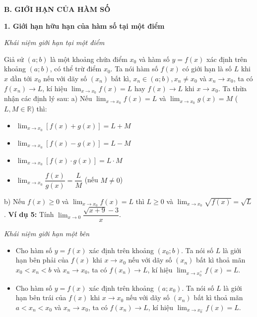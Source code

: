 \documentclass[12pt,a4paper]{extarticle}
\begin{document}
\noindent\textbf{B. GIỚI HẠN CỦA HÀM SỐ}

\noindent\textbf{1. Giới hạn hữu hạn của hàm số tại một điểm}
\vspace{0.2cm}

\noindent\textit{Khái niệm giới hạn tại một điểm}

\noindent Giả sử $(a; b)$ là một khoảng chứa điểm $x_0$ và hàm số $y = f(x)$ xác định trên khoảng $(a; b)$, có thể trừ điểm $x_0$. Ta nói hàm số $f(x)$ có giới hạn là số $L$ khi $x$ dần tới $x_0$ nếu với dãy số $(x_n)$ bất kì, $x_n \in (a; b), x_n \ne x_0$ và $x_n \to x_0$, ta có $f(x_n) \to L$, kí hiệu $\lim_{x \to x_0} f(x) = L$ hay $f(x) \to L$ khi $x \to x_0$.
\vspace{0.3cm}
\noindent Ta thừa nhận các định lý sau:
\noindent a) Nếu $\lim_{x \to x_0} f(x) = L$ và $\lim_{x \to x_0} g(x) = M$ ($L, M \in \mathbb{R}$) thì:
\begin{itemize}
    \item $\lim_{x \to x_0} [f(x) + g(x)] = L + M$
    \item $\lim_{x \to x_0} [f(x) - g(x)] = L - M$
    \item $\lim_{x \to x_0} [f(x) \cdot g(x)] = L \cdot M$
    \item $\lim_{x \to x_0} \dfrac{f(x)}{g(x)} = \dfrac{L}{M}$ (nếu $M \ne 0$)
\end{itemize}
\noindent b) Nếu $f(x) \ge 0$ và $\lim_{x \to x_0} f(x) = L$ thì $L \ge 0$ và $\lim_{x \to x_0} \sqrt{f(x)} = \sqrt{L}$.
\vspace{0.4cm}
\noindent\textbf{Ví dụ 5:} Tính $\lim_{x \to 0} \dfrac{\sqrt{x + 9} - 3}{x}$.
\vspace{0.6cm}

\noindent\textit{Khái niệm giới hạn một bên}
\begin{itemize}
    \item Cho hàm số $y = f(x)$ xác định trên khoảng $(x_0; b)$. Ta nói số $L$ là giới hạn bên phải của $f(x)$ khi $x \to x_0$ nếu với dãy số $(x_n)$ bất kì thoả mãn $x_0 < x_n < b$ và $x_n \to x_0$, ta có $f(x_n) \to L$, kí hiệu $\lim_{x \to x_0^+} f(x) = L$.
    \item Cho hàm số $y = f(x)$ xác định trên khoảng $(a; x_0)$. Ta nói số $L$ là giới hạn bên trái của $f(x)$ khi $x \to x_0$ nếu với dãy số $(x_n)$ bất kì thoả mãn $a < x_n < x_0$ và $x_n \to x_0$, ta có $f(x_n) \to L$, kí hiệu $\lim_{x \to x_0^-} f(x) = L$.
\end{itemize}
\vspace{0.4cm}
\end{document}
